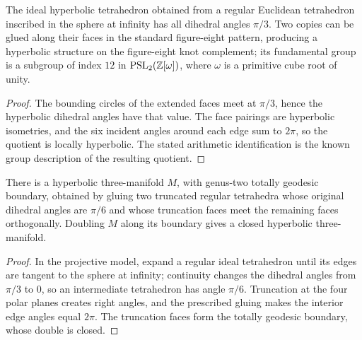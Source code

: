 \begin{proposition}
\label{thurston-ch03-figure-eight-tetrahedra}

The ideal hyperbolic tetrahedron obtained from a regular Euclidean tetrahedron inscribed in the sphere at infinity has all dihedral angles \(\pi/3\). Two copies can be glued along their faces in the standard figure-eight pattern, producing a hyperbolic structure on the figure-eight knot complement; its fundamental group is a subgroup of index \(12\) in \(\operatorname{PSL}_2(\mathbb{Z}[\omega])\), where \(\omega\) is a primitive cube root of unity.
\end{proposition}
\begin{proof}
\sketch The bounding circles of the extended faces meet at \(\pi/3\), hence the hyperbolic dihedral angles have that value. The face pairings are hyperbolic isometries, and the six incident angles around each edge sum to \(2\pi\), so the quotient is locally hyperbolic. The stated arithmetic identification is the known group description of the resulting quotient.
\end{proof}

\begin{proposition}
\label{thurston-ch03-geodesic-boundary}

There is a hyperbolic three-manifold \(M\), with genus-two totally geodesic boundary, obtained by gluing two truncated regular tetrahedra whose original dihedral angles are \(\pi/6\) and whose truncation faces meet the remaining faces orthogonally. Doubling \(M\) along its boundary gives a closed hyperbolic three-manifold.
\end{proposition}
\begin{proof}
\sketch In the projective model, expand a regular ideal tetrahedron until its edges are tangent to the sphere at infinity; continuity changes the dihedral angles from \(\pi/3\) to \(0\), so an intermediate tetrahedron has angle \(\pi/6\). Truncation at the four polar planes creates right angles, and the prescribed gluing makes the interior edge angles equal \(2\pi\). The truncation faces form the totally geodesic boundary, whose double is closed.
\end{proof}

